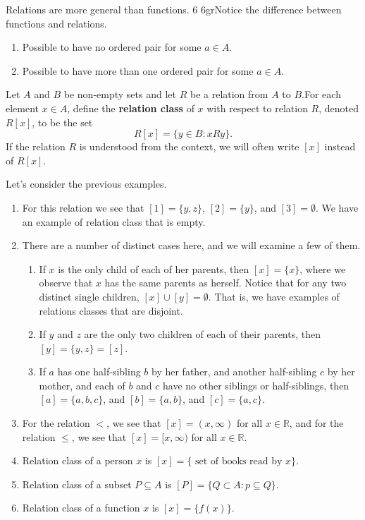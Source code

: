 \documentclass[a4paper,english,12pt]{article}
\begin{document}
\begin{rem} Relations are more general than functions.  6 6grNotice the difference between functions and relations.
\begin{enumerate}
	\item Possible to have no ordered pair for some $a \in A$.
	\item Possible to have more than one ordered pair for some $a \in A$.
\end{enumerate}
\end{rem}
\begin{defn} Let $A$ and $B$ be non-empty sets and let $R$ be a relation from $A$ to $B$.For each element $x \in A$, define the \textbf{relation class} of $x$ with respect to relation $R$, denoted $R[x]$, to be the set
\begin{equation*} 
R[x] =\{y \in B : x R y \}.
\end{equation*} 
If the relation $R$ is understood from the context, we will often write $[x]$ instead of $R[x]$.
\end{defn}
\begin{exmp} Let's consider the previous examples.
\begin{enumerate}
	\item For this relation we see that $[1]=\{y,z\}$, $[2]=\{y\}$, and $[3] = \emptyset$. We have an example of relation class that is empty.
	\item There are a number of distinct cases here, and we will examine a few of them. 
	\begin{enumerate}
		\item If $x$ is the only child of each of her parents, then $[x] = \{x\}$, where we observe that
$x$ has the same parents as herself. Notice that for any two distinct single children, $[x] \cup [y] = \emptyset$. That is, we have examples of relations classes that are disjoint.
		\item If $y$ and $z$ are the only two children of each of their parents, then $[y] = \{y, z\} = [z]$. 
		\item If $a$ has one half-sibling $b$ by her father, and another half-sibling $c$ by her mother, and each of $b$ and $c$ have no other siblings or half-siblings, then $[a] = \{a, b, c\}$, and $[b] = \{a, b\}$, and $[c] = \{a, c\}$.
	\end{enumerate}
	\item For the relation $<$, we see that $[x] = (x, \infty)$ for all $x \in \mathbb{R}$, and for the relation
$\leq$, we see that $[x] = [x, \infty)$ for all $x \in \mathbb{R}$.
	\item Relation class of a person $x$ is $[x] = \{\text{ set of books read by }x\}$. 
	\item Relation class of a subset $P \subseteq A$ is $[P] = \{ Q \subset A: p \subseteq Q \}$.
	\item Relation class of a function $x$ is $[x] = \{f(x)\}$.
\end{enumerate}
\end{exmp}
\end{document}
